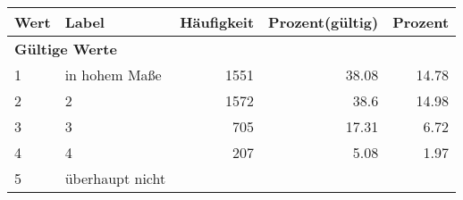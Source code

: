      \begin{longtable}{lXrrr}
     \toprule
     \textbf{Wert} & \textbf{Label} & \textbf{Häufigkeit} & \textbf{Prozent(gültig)} & \textbf{Prozent} \\
     \endhead
     \midrule
     \multicolumn{5}{l}{\textbf{Gültige Werte}}\\

     1 &
     \multicolumn{1}{X}{ in hohem Maße   } &


       \num{1551} &
       \num[round-mode=places,round-precision=2]{38.08} &
         \num[round-mode=places,round-precision=2]{14.78} \\

     2 &
     \multicolumn{1}{X}{ 2   } &


       \num{1572} &
       \num[round-mode=places,round-precision=2]{38.6} &
         \num[round-mode=places,round-precision=2]{14.98} \\

     3 &
     \multicolumn{1}{X}{ 3   } &


       \num{705} &
       \num[round-mode=places,round-precision=2]{17.31} &
         \num[round-mode=places,round-precision=2]{6.72} \\

     4 &
     \multicolumn{1}{X}{ 4   } &


       \num{207} &
       \num[round-mode=places,round-precision=2]{5.08} &
         \num[round-mode=places,round-precision=2]{1.97} \\

     5 &
     \multicolumn{1}{X}{ überhaupt nicht   } &



\end{longtable}
